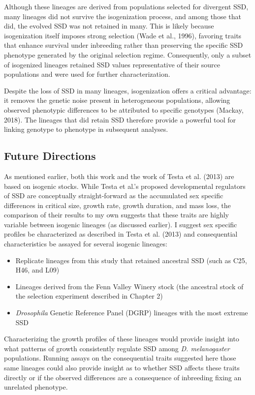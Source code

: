 \documentclass[12pt,reqno,oneside]{report}
\begin{document}
Although these lineages are derived from populations selected for divergent SSD, many lineages did not survive the isogenization process, and among those that did, the evolved SSD was not retained in many. This is likely because isogenization itself imposes strong selection (Wade et al., 1996), favoring traits that enhance survival under inbreeding rather than preserving the specific SSD phenotype generated by the original selection regime. Consequently, only a subset of isogenized lineages retained SSD values representative of their source populations and were used for further characterization.

Despite the loss of SSD in many lineages, isogenization offers a critical advantage: it removes the genetic noise present in heterogeneous populations, allowing observed phenotypic differences to be attributed to specific genotypes (Mackay, 2018). The lineages that did retain SSD therefore provide a powerful tool for linking genotype to phenotype in subsequent analyses.

\subsection{Future Directions}

As mentioned earlier, both this work and the work of Testa et al. (2013) are based on isogenic stocks. While Testa et al.'s proposed developmental regulators of SSD are conceptually straight-forward as the accumulated sex specific differences in critical size, growth rate, growth duration, and mass loss, the comparison of their results to my own suggests that these traits are highly variable between isogenic lineages (as discussed earlier). I suggest sex specific profiles be characterized as described in Testa et al. (2013) and consequential characteristics be assayed for several isogenic lineages:

\begin{itemize}
    \item Replicate lineages from this study that retained ancestral SSD (such as C25, H46, and L09)
    \item Lineages derived from the Fenn Valley Winery stock (the ancestral stock of the selection experiment described in Chapter 2)
    \item \textit{Drosophila} Genetic Reference Panel (DGRP) lineages with the most extreme SSD
\end{itemize}

Characterizing the growth profiles of these lineages would provide insight into what patterns of growth consistently regulate SSD among \textit{D. melanogaster} populations. Running assays on the consequential traits suggested here those same lineages could also provide insight as to whether SSD affects these traits directly or if the observed differences are a consequence of inbreeding fixing an unrelated phenotype. 
\end{document}
